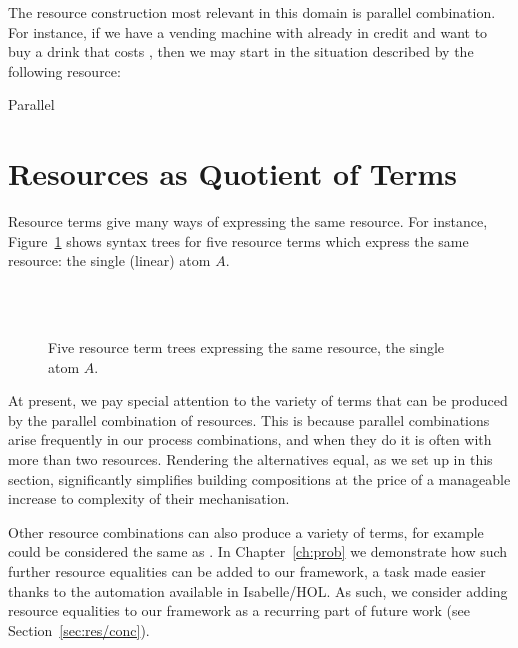\documentclass[class=smolathesis,crop=false]{standalone}
\begin{document}
The resource construction most relevant in this domain is parallel combination.
For instance, if we have a vending machine with  already in credit and want to buy a drink that costs , then we may start in the situation described by the following resource:
\begin{isabelle}
\centering
  Parallel\ 
\end{isabelle}

\section{Resources as Quotient of Terms}
\label{sec:res/quot}

Resource terms give many ways of expressing the same resource.
For instance, Figure~\ref{fig:res_eq} shows syntax trees for five resource terms which express the same resource: the single (linear) atom $A$.

\begin{figure}[htbp]
  \centering
  \quad
  \quad
  
  \\~\\
  \quad
  
  \caption{Five resource term trees expressing the same resource, the single atom $A$.}
  \label{fig:res_eq}
\end{figure}

At present, we pay special attention to the variety of terms that can be produced by the parallel combination of resources.
This is because parallel combinations arise frequently in our process combinations, and when they do it is often with more than two resources.
Rendering the alternatives equal, as we set up in this section, significantly simplifies building compositions at the price of a manageable increase to complexity of their mechanisation.

Other resource combinations can also produce a variety of terms, for example  could be considered the same as .
In Chapter~\ref{ch:prob} we demonstrate how such further resource equalities can be added to our framework, a task made easier thanks to the automation available in Isabelle/HOL.
As such, we consider adding resource equalities to our framework as a recurring part of future work (see Section~\ref{sec:res/conc}).
\end{document}
